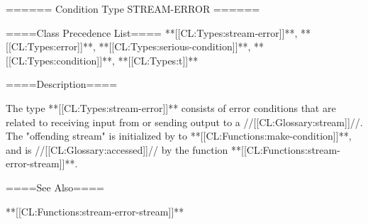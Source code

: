 ====== Condition Type STREAM-ERROR ======

====Class Precedence List==== **[[CL:Types:stream-error]]**, **[[CL:Types:error]]**, **[[CL:Types:serious-condition]]**, **[[CL:Types:condition]]**, **[[CL:Types:t]]**

====Description====

The type **[[CL:Types:stream-error]]** consists of error conditions that are related to receiving input from or sending output to a //[[CL:Glossary:stream]]//. The "offending stream" is initialized by  to **[[CL:Functions:make-condition]]**, and is //[[CL:Glossary:accessed]]// by the function **[[CL:Functions:stream-error-stream]]**.

====See Also====

**[[CL:Functions:stream-error-stream]]**

